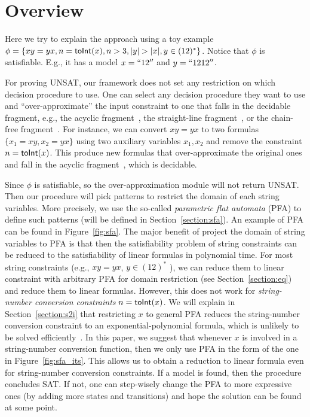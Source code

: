 \documentclass[sigplan,review,anonymous]{acmart}\settopmatter{printfolios=true,printccs=false,printacmref=false}
\begin{document}
\section{Overview} \label{section:overview}

Here we try to explain the approach using a toy example $\phi = \{xy=yx, n = \sti{x}, n >3 ,|y|>|x|, y \in (12)^*\}$. Notice that $\phi$ is satisfiable. E.g., it has a model $x=``12''$ and $y=``1212''$.

For proving UNSAT, our framework does not set any restriction on which decision procedure to use. One can select any decision procedure they want to use and ``over-approximate'' the input constraint to one that falls in the decidable fragment, e.g., the acyclic fragment~\cite{abdulla2014string}, the straight-line fragment~\cite{chen2019decision}, or the chain-free fragment~\cite{abdulla2019chain}. For instance, we can convert $xy=yx$ to two formulas $\{x_1=xy, x_2=yx\}$ using two auxiliary variables $x_1,x_2$ and remove the constraint $n=\mbox{\textsf{toInt}($x$)}$. This produce new formulas that over-approximate the original ones and fall in the acyclic fragment~\cite{abdulla2014string}, which is decidable. 

Since $\phi$ is satisfiable, so the over-approximation module will not return UNSAT. Then our procedure will pick patterns to restrict the domain of each string variables. More precisely, we use the so-called \emph{parametric flat automata} (PFA) to define such patterns (will be defined in Section~\ref{section:sfa}). An example of PFA can be found in Figure~\ref{fig:sfa}. The major benefit of project the domain of string variables to PFA is that then the satisfiability problem of string constraints can be reduced to the satisfiability of linear formulas in polynomial time. For most string constraints (e.g., $xy=yx$, $y \in (12)^*$ ), we can reduce them to linear constraint with arbitrary PFA for domain restriction (see Section~\ref{section:eq}) and reduce them to linear formulas. However, this does not work for \emph{string-number conversion constraints} $n = \mbox{\textsf{toInt}($x$)}$. We will explain in Section~\ref{section:s2i} that restricting $x$ to general PFA reduces the string-number conversion constraint to an exponential-polynomial formula, which is unlikely to be solved efficiently~\cite{achatz2008deciding}. In this paper, we suggest that whenever $x$ is involved in a string-number conversion function, then we only use PFA in the form of the one in Figure~\ref{fig:sfa_its}. This allows us to obtain a reduction to linear formula even for string-number conversion constraints. If a model is found, then the procedure concludes SAT.  If not, one can step-wisely change the PFA to more expressive ones (by adding more states and transitions) and hope the solution can be found at some point.
\end{document}
